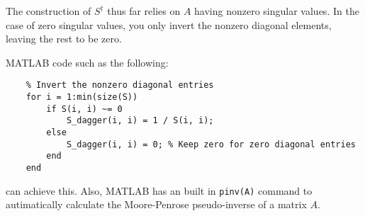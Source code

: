 \documentclass{ximera}
\begin{document}
\begin{remark}

  The construction of $S^\dagger$ thus far relies on $A$ having nonzero singular values. In the case of zero singular values, you only invert the nonzero diagonal elements, leaving the rest to be zero. 

  MATLAB code such as the following:

  \begin{verbatim}
    % Invert the nonzero diagonal entries
    for i = 1:min(size(S))
        if S(i, i) ~= 0
            S_dagger(i, i) = 1 / S(i, i);
        else
            S_dagger(i, i) = 0; % Keep zero for zero diagonal entries
        end
    end
  \end{verbatim}

  can achieve this. Also, MATLAB has an built in \texttt{pinv(A)} command to autimatically calculate the Moore-Penrose pseudo-inverse of a matrix $A$.

\end{remark}
\end{document}
